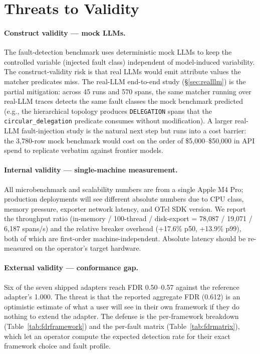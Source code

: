 \documentclass[sigplan,10pt,anonymous,review]{acmart}
\begin{document}
\section{Threats to Validity}
\label{sec:threats}

\paragraph{Construct validity --- mock LLMs.} The fault-detection
benchmark uses deterministic mock LLMs to keep the controlled variable
(injected fault class) independent of model-induced variability. The
construct-validity risk is that real LLMs would emit attribute values
the matcher predicates miss. The real-LLM end-to-end study
(\S\ref{sec:realllm}) is the partial mitigation: across 45 runs and
570 spans, the same matcher running over real-LLM traces detects the
same fault classes the mock benchmark predicted (e.g., the
hierarchical topology produces \texttt{DELEGATION} spans that the
\texttt{circular\_delegation} predicate consumes without modification).
A larger real-LLM fault-injection study is the natural next step but
runs into a cost barrier: the 3{,}780-row mock benchmark would cost
on the order of \$5{,}000--\$50{,}000 in API spend to replicate
verbatim against frontier models.

\paragraph{Internal validity --- single-machine measurement.} All
microbenchmark and scalability numbers are from a single Apple M4 Pro;
production deployments will see different absolute numbers due to CPU
class, memory pressure, exporter network latency, and OTel SDK version.
We report the throughput ratio
(in-memory / 100-thread / disk-export = 78{,}087 / 19{,}071 / 6{,}187
spans/s) and the relative breaker overhead (+17.6\% p50, +13.9\% p99),
both of which are first-order machine-independent. Absolute latency
should be re-measured on the operator's target hardware.

\paragraph{External validity --- conformance gap.} Six of the seven
shipped adapters reach FDR 0.50--0.57 against the reference adapter's
1.000. The threat is that the reported aggregate FDR (0.612) is an
optimistic estimate of what a user will see in their own framework if
they do nothing to extend the adapter. The defense is the per-framework
breakdown (Table~\ref{tab:fdrframework}) and the per-fault matrix
(Table~\ref{tab:fdrmatrix}), which let an operator compute the expected
detection rate for their exact framework choice and fault profile.
\end{document}
